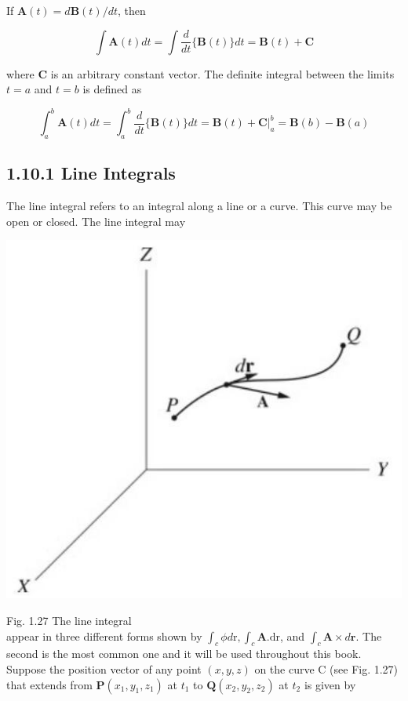 \documentclass[10pt]{article}
\begin{document}
If $\mathbf{A}(t)=d \mathbf{B}(t) / d t$, then

$$
\int \mathbf{A}(t) d t=\int \frac{d}{d t}\{\mathbf{B}(t)\} d t=\mathbf{B}(t)+\mathbf{C}
$$

where $\mathbf{C}$ is an arbitrary constant vector. The definite integral between the limits $t=a$ and $t=b$ is defined as

$$
\int_{a}^{b} \mathbf{A}(t) d t=\int_{a}^{b} \frac{d}{d t}\{\mathbf{B}(t)\} d t=\mathbf{B}(t)+\left.\mathbf{C}\right|_{a} ^{b}=\mathbf{B}(b)-\mathbf{B}(a)
$$

\subsection*{1.10.1 Line Integrals}
The line integral refers to an integral along a line or a curve. This curve may be open or closed. The line integral may

\begin{center}
\includegraphics[max width=\textwidth]{2024_09_13_db1f357d2aad0a03eb2eg-024}
\end{center}

Fig. 1.27 The line integral\\
appear in three different forms shown by $\int_{c} \phi d \mathrm{r}, \int_{c} \mathbf{A} . \mathrm{dr}$, and $\int_{c} \mathbf{A} \times d \mathbf{r}$. The second is the most common one and it will be used throughout this book. Suppose the position vector of any point $(x, y, z)$ on the curve C (see Fig. 1.27) that extends from $\mathbf{P}\left(x_{1}, y_{1}, z_{1}\right)$ at $t_{1}$ to $\mathbf{Q}\left(x_{2}, y_{2}, z_{2}\right)$ at $t_{2}$ is given by
\end{document}
